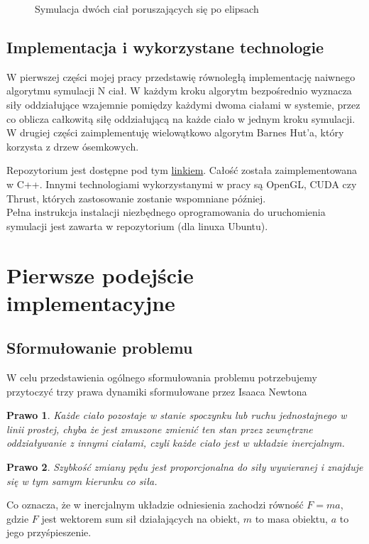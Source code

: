 \documentclass[14pt,twoside,a4paper]{article}
\newtheorem{theorem}{Prawo}
\begin{document}
\begin{figure}
    \centering
    \def\svgwidth{\columnwidth}
    
    \caption{Symulacja dwóch ciał poruszających się po elipsach}
\end{figure}


\subsection{\Large Implementacja i wykorzystane technologie}
W pierwszej części mojej pracy przedstawię równoległą implementację naiwnego algorytmu symulacji N ciał. W każdym kroku algorytm bezpośrednio wyznacza siły oddziałujące wzajemnie pomiędzy każdymi dwoma ciałami w systemie, przez co oblicza całkowitą siłę oddziałującą na każde ciało w jednym kroku symulacji. W drugiej części zaimplementuję wielowątkowo algorytm Barnes Hut'a, który korzysta z drzew ósemkowych.

Repozytorium jest dostępne pod tym \href{https://github.com/damian1996/N-Body-Simulation}{linkiem}.
Całość została zaimplementowana w C++. Innymi technologiami wykorzystanymi w pracy są OpenGL, CUDA czy Thrust, których zastosowanie zostanie wspomniane później. \\
Pełna instrukcja instalacji niezbędnego oprogramowania do uruchomienia symulacji jest zawarta w repozytorium (dla linuxa Ubuntu).

\section{\LARGE Pierwsze podejście implementacyjne}
\bigskip

\subsection{\Large Sformułowanie problemu}
W celu przedstawienia ogólnego sformułowania problemu potrzebujemy przytoczyć trzy prawa dynamiki sformułowane przez Isaaca Newtona \cite{fund}

\begin{theorem}
Każde ciało pozostaje w stanie spoczynku lub ruchu jednostajnego w linii prostej, chyba że jest zmuszone zmienić ten stan przez zewnętrzne oddziaływanie z innymi ciałami, czyli każde ciało jest w układzie inercjalnym.
\end{theorem}

\begin{theorem}
Szybkość zmiany pędu jest proporcjonalna do siły wywieranej i znajduje się w tym samym kierunku co siła.
\end{theorem}
Co oznacza, że w inercjalnym układzie odniesienia zachodzi równość $F=ma$, gdzie $F$ jest wektorem sum sił działających na obiekt, $m$ to masa obiektu, $a$ to jego przyśpieszenie.
\end{document}

